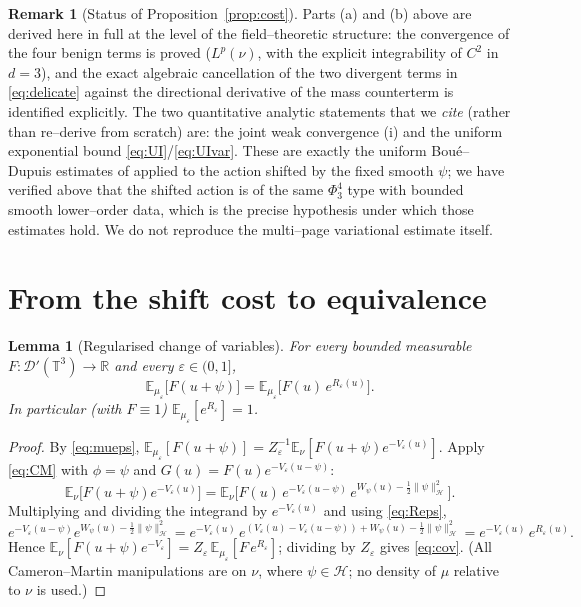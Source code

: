 \documentclass[12pt]{article}
\newtheorem{lemma}{Lemma}
\theoremstyle{definition}
\newtheorem{remark}{Remark}
\newcommand{\T}{\mathbb{T}^3}
\newcommand{\R}{\mathbb{R}}
\newcommand{\E}{\mathbb{E}}
\newcommand{\D}{\mathcal{D}'(\T)}
\begin{document}
\begin{remark}[Status of Proposition~\ref{prop:cost}]\label{rem:status}
Parts \textup{(a)} and \textup{(b)} above are derived here in full at the level of the
field--theoretic structure: the convergence of the four benign terms is proved
($L^p(\nu)$, with the explicit integrability of $C^2$ in $d=3$), and the exact algebraic
cancellation of the two divergent terms in \eqref{eq:delicate} against the directional
derivative of the mass counterterm is identified explicitly. The two quantitative
analytic statements that we \emph{cite} (rather than re--derive from scratch) are: the
joint weak convergence \textup{(i)} and the uniform exponential bound
\eqref{eq:UI}/\eqref{eq:UIvar}. These are exactly the uniform Bou\'e--Dupuis estimates of
\cite{BG} applied to the action shifted by the fixed smooth $\psi$; we have verified above
that the shifted action is of the same $\Phi^4_3$ type with bounded smooth lower--order
data, which is the precise hypothesis under which those estimates hold. We do not reproduce
the multi--page variational estimate itself.
\end{remark}

\section{From the shift cost to equivalence}

\begin{lemma}[Regularised change of variables]\label{lem:cov}
For every bounded measurable $F\colon\D\to\R$ and every $\varepsilon\in(0,1]$,
\begin{equation}\label{eq:cov}
  \E_{\mu_\varepsilon}\!\big[F(u+\psi)\big]
  =\E_{\mu_\varepsilon}\!\big[F(u)\,e^{R_\varepsilon(u)}\big].
\end{equation}
In particular (with $F\equiv1$) $\E_{\mu_\varepsilon}[e^{R_\varepsilon}]=1$.
\end{lemma}

\begin{proof}
By \eqref{eq:mueps},
$\E_{\mu_\varepsilon}[F(u+\psi)]=Z_\varepsilon^{-1}\E_\nu[F(u+\psi)e^{-V_\varepsilon(u)}]$.
Apply \eqref{eq:CM} with $\phi=\psi$ and $G(u)=F(u)e^{-V_\varepsilon(u-\psi)}$:
\[
  \E_\nu\!\big[F(u+\psi)e^{-V_\varepsilon(u)}\big]
  =\E_\nu\!\Big[F(u)\,e^{-V_\varepsilon(u-\psi)}\,e^{W_\psi(u)-\frac12\|\psi\|_{\mathcal H}^2}\Big].
\]
Multiplying and dividing the integrand by $e^{-V_\varepsilon(u)}$ and using
\eqref{eq:Reps},
\[
  e^{-V_\varepsilon(u-\psi)}e^{W_\psi(u)-\frac12\|\psi\|_{\mathcal H}^2}
  =e^{-V_\varepsilon(u)}\,e^{(V_\varepsilon(u)-V_\varepsilon(u-\psi))+W_\psi(u)-\frac12\|\psi\|_{\mathcal H}^2}
  =e^{-V_\varepsilon(u)}\,e^{R_\varepsilon(u)} .
\]
Hence $\E_\nu[F(u+\psi)e^{-V_\varepsilon}]=Z_\varepsilon\,\E_{\mu_\varepsilon}[F\,e^{R_\varepsilon}]$;
dividing by $Z_\varepsilon$ gives \eqref{eq:cov}. (All Cameron--Martin manipulations are on
$\nu$, where $\psi\in\mathcal H$; no density of $\mu$ relative to $\nu$ is used.)
\end{proof}
\end{document}
